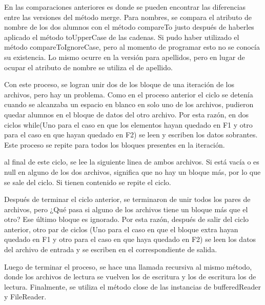 \documentclass[11pt]{article}
\begin{document}
\par 
En las comparaciones anteriores es donde se pueden encontrar las diferencias entre las versiones del método merge. Para nombres, se compara el atributo de nombre de los dos alumnos con el método compareTo justo después de haberles aplicado el método toUpperCase de las cadenas. Si pudo haber utilizado el método compareToIgnoreCase, pero al momento de programar esto no se conocía su existencia. Lo mismo ocurre en la versión para apellidos, pero en lugar de ocupar el atributo de nombre se utiliza el de apellido. 
\par
Con este proceso, se logran unir dos de los bloque de una iteración de los archivos, pero hay un problema. Como en el proceso anterior el ciclo se detenía cuando se alcanzaba un espacio en blanco en solo uno de los archivos, pudieron quedar alumnos en el bloque de datos del otro archivo. Por esta razón, en dos ciclos while(Uno para el caso en que los elementos hayan quedado en F1 y otro para el caso en que hayan quedado en F2) se leen y escriben los datos sobrantes. Este proceso se repite para todos los bloques presentes en la iteración.
\par
al final de este ciclo, se lee la siguiente linea de ambos archivos. Si está vacía o es null en alguno de los dos archivos, significa que no hay un bloque más, por lo que se sale del ciclo. Si tienen contenido se repite el ciclo.
\par
Después de terminar el ciclo anterior, se terminaron de unir todos los pares de archivos, pero ¿Qué pasa si alguno de los archivos tiene un bloque más que el otro? Ese último bloque es ignorado. Por esta razón, después de salir del ciclo anterior, otro par de ciclos (Uno para el caso en que el bloque extra hayan quedado en F1 y otro para el caso en que haya quedado en F2) se leen los datos del archivo de entrada y se escriben en el correspondiente de salida.
\par
Luego de terminar el proceso, se hace una llamada recursiva al mismo método, donde los archivos de lectura se vuelven los de escritura y los de escritura los de lectura. Finalmente, se utiliza el método close de las instancias de bufferedReader y FileReader. 
\end{document}
